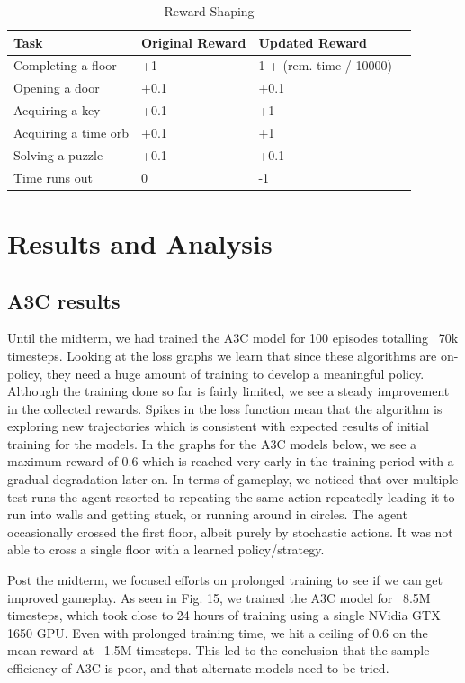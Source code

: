 \documentclass[conference]{IEEEtran}
\begin{document}
\begin{table}[h!]
    \centering
    \begin{tabular}{ |l|l|l|l| } 
        \hline
        Task & Original Reward & Updated Reward \\
        \hline
        Completing a floor   & +1   & 1 + (rem. time / 10000) \\ 
        Opening a door       & +0.1 & +0.1 \\ 
        Acquiring a key      & +0.1 & +1 \\ 
        Acquiring a time orb & +0.1 & +1 \\ 
        Solving a puzzle     & +0.1 & +0.1 \\ 
        Time runs out        & 0    & -1 \\ 
    \hline
    \end{tabular}
    \vspace{1ex}
    \caption{Reward Shaping}
    \label{reward_table}
\end{table}

\section{Results and Analysis}

\subsection{A3C results}

Until the midterm, we had trained the A3C model for 100 episodes totalling ~70k timesteps. Looking at the loss graphs we learn that since these algorithms are on-policy, they need a huge amount of training to develop a meaningful policy. Although the training done so far is fairly limited, we see a steady improvement in the collected rewards. Spikes in the loss function mean that the algorithm is exploring new trajectories which is consistent with expected results of initial training for the models. In the graphs for the A3C models below, we see a maximum reward of 0.6 which is reached very early in the training period with a gradual degradation later on. In terms of gameplay, we noticed that over multiple test runs the agent resorted to repeating the same action repeatedly leading it to run into walls and getting stuck, or running around in circles. The agent occasionally crossed the first floor, albeit purely by stochastic actions. It was not able to cross a single floor with a learned policy/strategy.

Post the midterm, we focused efforts on prolonged training to see if we can get improved gameplay. As seen in Fig. 15, we trained the A3C model for ~8.5M timesteps, which took close to 24 hours of training using a single NVidia GTX 1650 GPU. Even with prolonged training time, we hit a ceiling of 0.6 on the mean reward at ~1.5M timesteps. This led to the conclusion that the sample efficiency of A3C is poor, and that alternate models need to be tried. 
\end{document}

